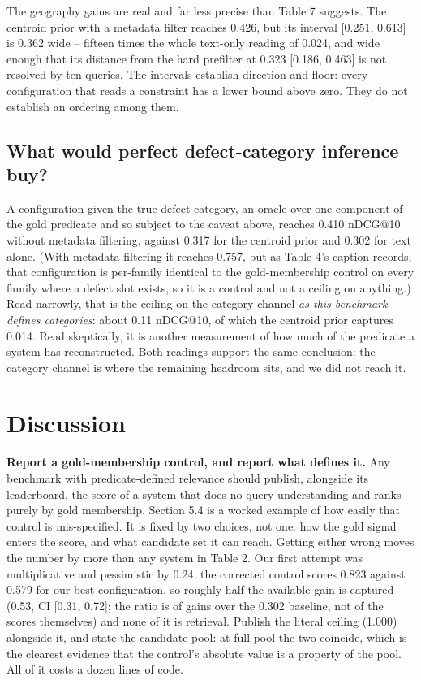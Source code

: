\documentclass[acmsmall]{acmart}
\begin{document}
The geography gains are real and far less precise than Table 7 suggests. The centroid prior with a metadata filter reaches 0.426, but its interval [0.251, 0.613] is 0.362 wide -- fifteen times the whole text-only reading of 0.024, and wide enough that its distance from the hard prefilter at 0.323 [0.186, 0.463] is not resolved by ten queries. The intervals establish direction and floor: every configuration that reads a constraint has a lower bound above zero. They do not establish an ordering among them.


\subsection{What would perfect defect-category inference buy?}
A configuration given the true defect category, an oracle over one component of the gold predicate and so subject to the caveat above, reaches 0.410 nDCG@10 without metadata filtering, against 0.317 for the centroid prior and 0.302 for text alone. (With metadata filtering it reaches 0.757, but as Table 4's caption records, that configuration is per-family identical to the gold-membership control on every family where a defect slot exists, so it is a control and not a ceiling on anything.) Read narrowly, that is the ceiling on the category channel \textit{as this benchmark defines categories}: about 0.11 nDCG@10, of which the centroid prior captures 0.014. Read skeptically, it is another measurement of how much of the predicate a system has reconstructed. Both readings support the same conclusion: the category channel is where the remaining headroom sits, and we did not reach it.


\section{Discussion}
\textbf{Report a gold-membership control, and report what defines it.} Any benchmark with predicate-defined relevance should publish, alongside its leaderboard, the score of a system that does no query understanding and ranks purely by gold membership. Section 5.4 is a worked example of how easily that control is mis-specified. It is fixed by two choices, not one: how the gold signal enters the score, and what candidate set it can reach. Getting either wrong moves the number by more than any system in Table 2. Our first attempt was multiplicative and pessimistic by 0.24; the corrected control scores 0.823 against 0.579 for our best configuration, so roughly half the available gain is captured (0.53, CI [0.31, 0.72]; the ratio is of gains over the 0.302 baseline, not of the scores themselves) and none of it is retrieval. Publish the literal ceiling (1.000) alongside it, and state the candidate pool: at full pool the two coincide, which is the clearest evidence that the control's absolute value is a property of the pool. All of it costs a dozen lines of code.
\end{document}
